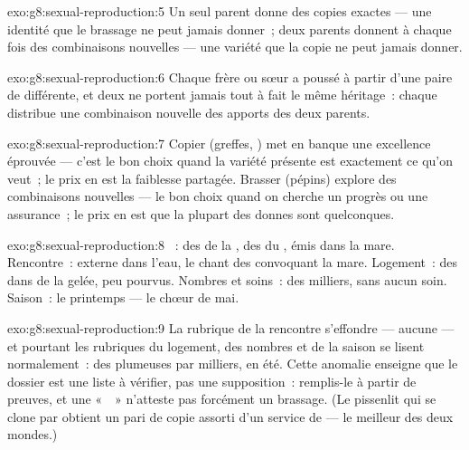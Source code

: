 \begin{solution}{exo:g8:sexual-reproduction:5}
Un seul parent donne des copies exactes --- une identité que le
brassage ne peut jamais donner~; deux parents donnent à chaque fois
des combinaisons nouvelles --- une variété que la copie ne peut
jamais donner.
\end{solution}

\begin{solution}{exo:g8:sexual-reproduction:6}
Chaque frère ou sœur a poussé à partir d'une paire de 
différente, et deux  ne portent jamais tout à fait le même
héritage~: chaque  distribue une combinaison nouvelle des
apports des deux parents.
\end{solution}

\begin{solution}{exo:g8:sexual-reproduction:7}
Copier (greffes, ) met en banque une excellence éprouvée ---
c'est le bon choix quand la variété présente est exactement ce qu'on
veut~; le prix en est la faiblesse partagée. Brasser (pépins)
explore des combinaisons nouvelles --- le bon choix quand on cherche
un progrès ou une assurance~; le prix en est que la plupart des
donnes sont quelconques.
\end{solution}

\begin{solution}{exo:g8:sexual-reproduction:8}
~: des  de la , des  du , émis
dans la mare. Rencontre~:  externe dans l'eau, le chant
des  convoquant la mare. Logement~: des  dans de la gelée,
peu pourvus. Nombres et soins~: des milliers, sans aucun soin.
Saison~: le printemps --- le chœur de mai.
\end{solution}

\begin{solution}{exo:g8:sexual-reproduction:9}
La rubrique de la rencontre s'effondre --- aucune  ---
et pourtant les rubriques du logement, des nombres et de la saison
se lisent normalement~: des  plumeuses par milliers, en été.
Cette anomalie enseigne que le dossier est une liste à vérifier, pas
une supposition~: remplis-le à partir de preuves, et une «~~»
n'atteste pas forcément un brassage. (Le pissenlit qui se clone par
 obtient un pari de copie assorti d'un service de
 --- le meilleur des deux mondes.)
\end{solution}

